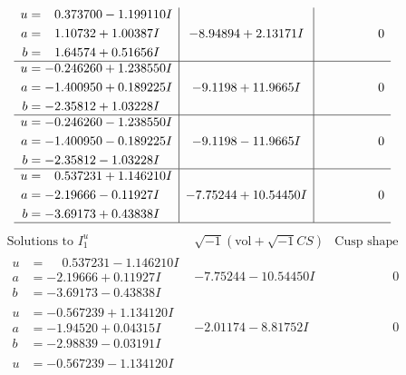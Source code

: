 \documentclass[1p]{elsarticle_modified}
\theoremstyle{definition}
\newcommand{\I}{\sqrt{-1}}
\begin{document}
$$\begin{array}{c|c|c}
\begin{aligned}
u &= \phantom{-}0.373700 - 1.199110 I \\
a &= \phantom{-}1.10732 + 1.00387 I \\
b &= \phantom{-}1.64574 + 0.51656 I\end{aligned}
 & -8.94894 + 2.13171 I & \phantom{-0.000000 } 0 \\ \hline\begin{aligned}
u &= -0.246260 + 1.238550 I \\
a &= -1.400950 + 0.189225 I \\
b &= -2.35812 + 1.03228 I\end{aligned}
 & -9.1198 + 11.9665 I & \phantom{-0.000000 } 0 \\ \hline\begin{aligned}
u &= -0.246260 - 1.238550 I \\
a &= -1.400950 - 0.189225 I \\
b &= -2.35812 - 1.03228 I\end{aligned}
 & -9.1198 - 11.9665 I & \phantom{-0.000000 } 0 \\ \hline\begin{aligned}
u &= \phantom{-}0.537231 + 1.146210 I \\
a &= -2.19666 - 0.11927 I \\
b &= -3.69173 + 0.43838 I\end{aligned}
 & -7.75244 + 10.54450 I & \phantom{-0.000000 } 0\\
 \hline 
 \end{array}$$\newpage$$\begin{array}{c|c|c}  
\text{Solutions to }I^u_{1}& \I (\text{vol} + \sqrt{-1}CS) & \text{Cusp shape}\\
 \hline 
\begin{aligned}
u &= \phantom{-}0.537231 - 1.146210 I \\
a &= -2.19666 + 0.11927 I \\
b &= -3.69173 - 0.43838 I\end{aligned}
 & -7.75244 - 10.54450 I & \phantom{-0.000000 } 0 \\ \hline\begin{aligned}
u &= -0.567239 + 1.134120 I \\
a &= -1.94520 + 0.04315 I \\
b &= -2.98839 - 0.03191 I\end{aligned}
 & -2.01174 - 8.81752 I & \phantom{-0.000000 } 0 \\ \hline\begin{aligned}
u &= -0.567239 - 1.134120 I \\

\end{aligned}
\end{array}$$
\end{document}
